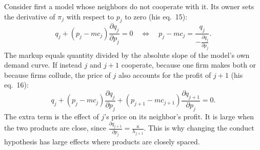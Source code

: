 Consider first a model whose neighbors do not cooperate with it. Its owner sets the derivative of $\pi_j$ with
respect to $p_j$ to zero (his eq.~15):
\begin{equation}\label{eq:06-bres-foc-single}
  q_j + (p_j - mc_j)\frac{\partial q_j}{\partial p_j} = 0
  \quad\Longleftrightarrow\quad
  p_j - mc_j = \frac{q_j}{-\frac{\partial q_j}{\partial p_j}} .
\end{equation}
The markup equals quantity divided by the absolute slope of the model's own demand curve. If instead $j$ and $j+1$
cooperate, because one firm makes both or because firms collude, the price of $j$ also accounts for the profit of
$j+1$ (his eq.~16):
\begin{equation}\label{eq:06-bres-foc-coop}
  q_j + (p_j - mc_j)\frac{\partial q_j}{\partial p_j} + (p_{j+1} - mc_{j+1})\frac{\partial q_{j+1}}{\partial p_j} = 0 .
\end{equation}
The extra term is the effect of $j$'s price on its neighbor's profit. It is large when the two products are close,
since $\frac{\partial q_{j+1}}{\partial p_j} = \frac{\kappa}{h_{j+1}}$. This is why changing the conduct hypothesis
has large effects where products are closely spaced.

